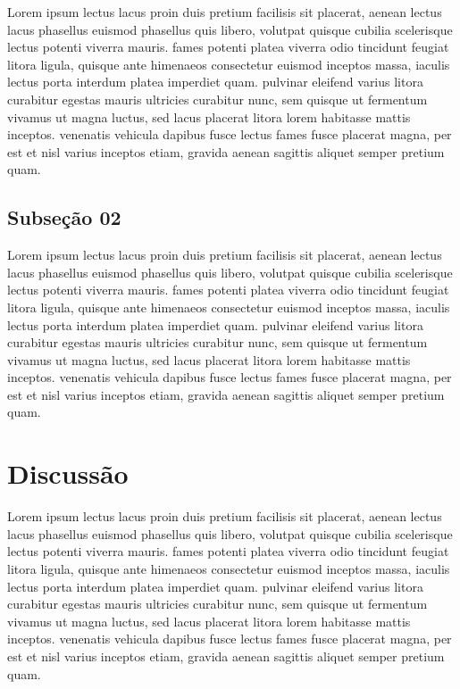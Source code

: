 \documentclass[journal,article,submit,moreauthors,pdftex,10pt,a4paper]{mdpi}
\begin{document}
Lorem ipsum lectus lacus proin duis pretium facilisis sit placerat, aenean lectus lacus phasellus euismod phasellus quis libero, volutpat quisque cubilia scelerisque lectus potenti viverra mauris. fames potenti platea viverra odio tincidunt feugiat litora ligula, quisque ante himenaeos consectetur euismod inceptos massa, iaculis lectus porta interdum platea imperdiet quam. pulvinar eleifend varius litora curabitur egestas mauris ultricies curabitur nunc, sem quisque ut fermentum vivamus ut magna luctus, sed lacus placerat litora lorem habitasse mattis inceptos. venenatis vehicula dapibus fusce lectus fames fusce placerat magna, per est et nisl varius inceptos etiam, gravida aenean sagittis aliquet semper pretium quam. 

\subsection{Subseção 02}

Lorem ipsum lectus lacus proin duis pretium facilisis sit placerat, aenean lectus lacus phasellus euismod phasellus quis libero, volutpat quisque cubilia scelerisque lectus potenti viverra mauris. fames potenti platea viverra odio tincidunt feugiat litora ligula, quisque ante himenaeos consectetur euismod inceptos massa, iaculis lectus porta interdum platea imperdiet quam. pulvinar eleifend varius litora curabitur egestas mauris ultricies curabitur nunc, sem quisque ut fermentum vivamus ut magna luctus, sed lacus placerat litora lorem habitasse mattis inceptos. venenatis vehicula dapibus fusce lectus fames fusce placerat magna, per est et nisl varius inceptos etiam, gravida aenean sagittis aliquet semper pretium quam. 

\section{Discussão}

Lorem ipsum lectus lacus proin duis pretium facilisis sit placerat, aenean lectus lacus phasellus euismod phasellus quis libero, volutpat quisque cubilia scelerisque lectus potenti viverra mauris. fames potenti platea viverra odio tincidunt feugiat litora ligula, quisque ante himenaeos consectetur euismod inceptos massa, iaculis lectus porta interdum platea imperdiet quam. pulvinar eleifend varius litora curabitur egestas mauris ultricies curabitur nunc, sem quisque ut fermentum vivamus ut magna luctus, sed lacus placerat litora lorem habitasse mattis inceptos. venenatis vehicula dapibus fusce lectus fames fusce placerat magna, per est et nisl varius inceptos etiam, gravida aenean sagittis aliquet semper pretium quam. 
\end{document}
